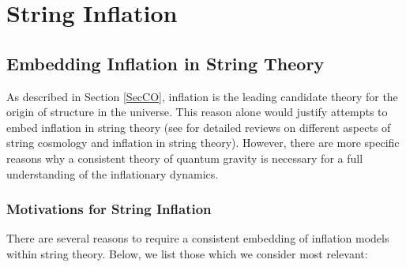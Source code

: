 \startdocument

\section{String Inflation}
\label{sec:Sinfla}

\subsection{Embedding Inflation in String Theory}

As described in Section \ref{SecCO}, inflation is the leading candidate theory for the origin of structure in the universe. This reason alone would justify attempts to embed inflation in string theory (see \cite{Quevedo:2002xw,Kallosh:2007ig,Burgess:2004jk,Burgess:2006nod,Burgess:2006uv,Cline:2006hu,HenryTye:2006uv,McAllister:2007bg,Copeland:2011dx,Cicoli:2011zz,Burgess:2011fa, Yamaguchi:2011kg, Burgess:2013sla,Baumann:2014nda,Silverstein:2016ggb,Nastase:2019mhe} for detailed reviews on different aspects of string cosmology and inflation in string theory). However, there are more specific reasons why a consistent theory of quantum gravity is necessary for a full understanding of the inflationary dynamics.

\subsubsection{Motivations for String Inflation}

There are several reasons to require a consistent embedding of inflation models within 
string theory. Below, we list those which we consider most relevant: 


